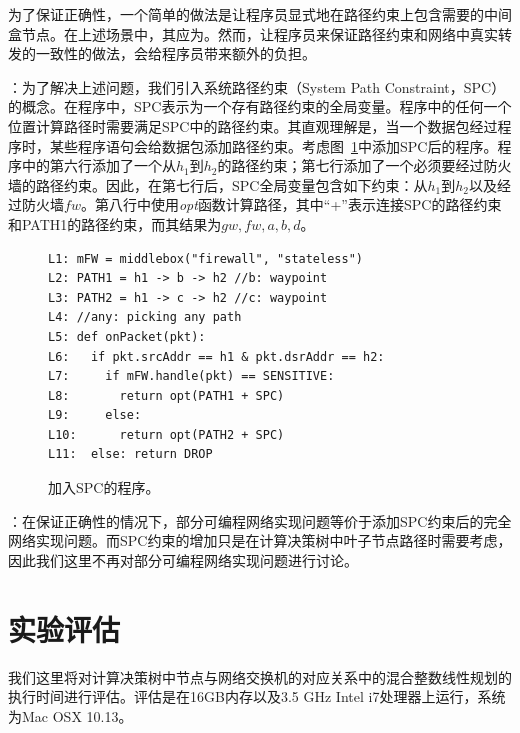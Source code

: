 为了保证正确性，一个简单的做法是让程序员显式地在路径约束上包含需要的中间盒节点。在上述场景中，其应为。然而，让程序员来保证路径约束和网络中真实转发的一致性的做法，会给程序员带来额外的负担。

：为了解决上述问题，我们引入系统路径约束（System Path Constraint，SPC）的概念。在程序中，SPC表示为一个存有路径约束的全局变量。程序中的任何一个位置计算路径时需要满足SPC中的路径约束。其直观理解是，当一个数据包经过程序时，某些程序语句会给数据包添加路径约束。考虑图~\ref{fig:code3}中添加SPC后的程序。程序中的第六行添加了一个从$h_1$到$h_2$的路径约束；第七行添加了一个必须要经过防火墙的路径约束。因此，在第七行后，SPC全局变量包含如下约束：从$h_1$到$h_2$以及经过防火墙$fw$。第八行中使用\emph{opt}函数计算路径，其中``+''表示连接SPC的路径约束和PATH1的路径约束，而其结果为$gw, fw, a, b, d$。

\begin{figure}[h]
{\small
\begin{verbatim}
L1: mFW = middlebox("firewall", "stateless")
L2: PATH1 = h1 -> b -> h2 //b: waypoint
L3: PATH2 = h1 -> c -> h2 //c: waypoint
L4: //any: picking any path
L5: def onPacket(pkt):
L6:   if pkt.srcAddr == h1 & pkt.dsrAddr == h2:
L7:     if mFW.handle(pkt) == SENSITIVE:
L8:       return opt(PATH1 + SPC)
L9:     else:
L10:      return opt(PATH2 + SPC)
L11:  else: return DROP
\end{verbatim}
}
    \caption{加入SPC的程序。}
\label{fig:code3}
\end{figure}

：在保证正确性的情况下，部分可编程网络实现问题等价于添加SPC约束后的完全网络实现问题。而SPC约束的增加只是在计算决策树中叶子节点路径时需要考虑，因此我们这里不再对部分可编程网络实现问题进行讨论。

\section{实验评估}

我们这里将对计算决策树中节点与网络交换机的对应关系中的混合整数线性规划的执行时间进行评估。评估是在16GB内存以及3.5 GHz Intel i7处理器上运行，系统为Mac OSX 10.13。


